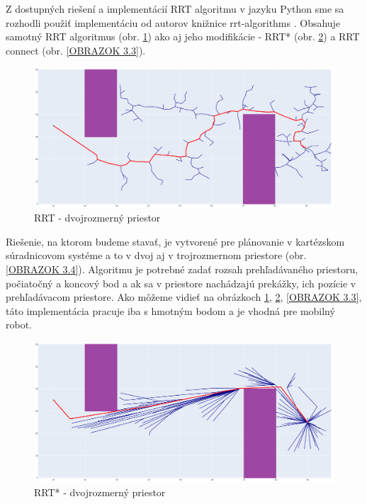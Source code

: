 Z dostupných riešení a implementácií RRT algoritmu v jazyku Python sme sa rozhodli použiť implementáciu od autorov knižnice rrt-algorithms \cite{RRT-python}. Obsahuje samotný RRT algoritmus (obr. \ref{OBRAZOK 3.1}) ako aj jeho modifikácie - RRT* (obr. \ref{OBRAZOK 3.2}) a RRT connect (obr. \ref{OBRAZOK 3.3}).

\begin{figure}[]
	\centering
	\includegraphics[width=140mm]{img/RRT-2D.png}
	\caption{RRT - dvojrozmerný priestor} \label{OBRAZOK 3.1} 
\end{figure} 

Riešenie, na ktorom budeme stavať, je vytvorené pre plánovanie v kartézskom súradnicovom systéme a to v dvoj aj v trojrozmernom priestore (obr. \ref{OBRAZOK 3.4}). Algoritmu je potrebné zadať rozsah prehľadávaného priestoru, počiatočný a koncový bod a ak sa v priestore nachádzajú prekážky, ich pozície v prehľadávacom priestore. Ako môžeme vidieť na obrázkoch \ref{OBRAZOK 3.1}, \ref{OBRAZOK 3.2}, \ref{OBRAZOK 3.3}, táto implementácia pracuje iba s hmotným bodom a je vhodná pre mobilný robot.
\begin{figure}[]
	\centering
	\includegraphics[width=140mm]{img/RRTstar-2D.png}
	\caption{RRT* - dvojrozmerný priestor} \label{OBRAZOK 3.2} 
\end{figure} 

